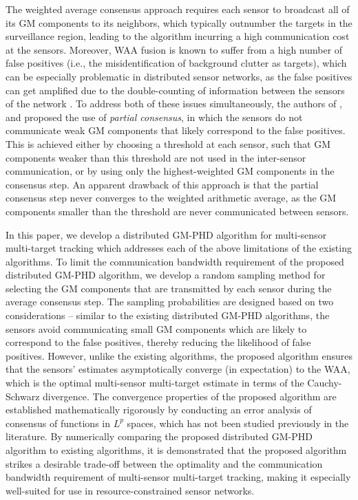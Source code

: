 The weighted average consensus approach requires each sensor to broadcast all of its GM components to its neighbors, which typically outnumber the targets in the surveillance region, leading to the algorithm incurring a high communication cost at the sensors. Moreover, WAA fusion is known to suffer from a high number of false positives (i.e., the misidentification of background clutter as targets), which can be especially problematic in distributed sensor networks, as the false positives can get amplified due to the double-counting of information between the sensors of the network \cite{li2020arithmetic}. 
To address both of these issues simultaneously, the authors of \cite{li2018partial, li2020parallel, li2021is}, and \cite{wu2022partial} proposed the use of \textit{partial consensus}, in which the sensors do not communicate weak GM components that likely correspond to the false positives. This is achieved either by choosing a threshold at each sensor, such that GM components weaker than this threshold are not used in the inter-sensor communication, or by using only the highest-weighted GM components in the consensus step. 
An apparent drawback of this approach is that the partial consensus step never converges to the weighted arithmetic average, as the GM components smaller than the threshold are never communicated between sensors.

In this paper, we develop a distributed GM-PHD algorithm for multi-sensor multi-target tracking which addresses each of the above limitations of the existing algorithms. To limit the communication bandwidth requirement of the proposed distributed GM-PHD algorithm, we develop a random sampling method for selecting the GM components that are transmitted by each sensor during the average consensus step. The sampling probabilities are designed based on two considerations -- similar to the existing distributed GM-PHD algorithms, the sensors avoid communicating small GM components which are likely to correspond to the false positives, thereby reducing the likelihood of false positives. However, unlike the existing algorithms, the proposed algorithm ensures that the sensors' estimates asymptotically converge (in expectation) to the WAA, which is the optimal multi-sensor multi-target estimate in terms of the Cauchy-Schwarz divergence.
The convergence properties of the proposed algorithm are established mathematically rigorously by conducting an error analysis of consensus of functions in $L^p$ spaces, which has not been studied previously in the literature.
By numerically comparing the proposed distributed GM-PHD algorithm to existing algorithms, it is demonstrated that the proposed algorithm strikes a desirable trade-off between the optimality and the communication bandwidth requirement of multi-sensor multi-target tracking, making it especially well-suited for use in resource-constrained sensor networks.

